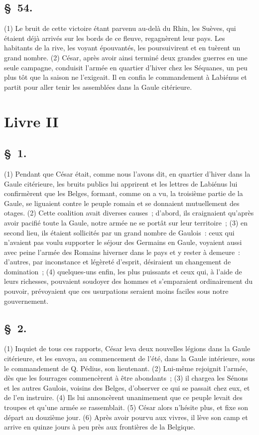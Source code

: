 \documentclass[french,twoside]{book} %
\begin{document}
\subsection[{§ 54.}]{ \textsc{§ 54.} }
\noindent (1) Le bruit de cette victoire étant parvenu au-delà du Rhin, les Suèves, qui étaient déjà arrivés sur les bords de ce fleuve, regagnèrent leur pays. Les habitants de la rive, les voyant épouvantés, les poursuivirent et en tuèrent un grand nombre. (2) César, après avoir ainsi terminé deux grandes guerres en une seule campagne, conduisit l’armée en quartier d’hiver chez les Séquanes, un peu plus tôt que la saison ne l’exigeait. Il en confia le commandement à Labiénus et partit pour aller tenir les assemblées dans la Gaule citérieure.
\section[{Livre II}]{Livre II}\renewcommand{\leftmark}{Livre II}

\subsection[{§ 1.}]{ \textsc{§ 1.} }
\noindent (1) Pendant que César était, comme nous l’avons dit, en quartier d’hiver dans la Gaule citérieure, les bruits publics lui apprirent et les lettres de Labiénus lui confirmèrent que les Belges, formant, comme on a vu, la troisième partie de la Gaule, se liguaient contre le peuple romain et se donnaient mutuellement des otages. (2) Cette coalition avait diverses causes ; d’abord, ils craignaient qu’après avoir pacifié toute la Gaule, notre armée ne se portât sur leur territoire ; (3) en second lieu, ils étaient sollicités par un grand nombre de Gaulois : ceux qui n’avaient pas voulu supporter le séjour des Germains en Gaule, voyaient aussi avec peine l’armée des Romains hiverner dans le pays et y rester à demeure : d’autres, par inconstance et légèreté d’esprit, désiraient un changement de domination ; (4) quelques-uns enfin, les plus puissants et ceux qui, à l’aide de leurs richesses, pouvaient soudoyer des hommes et s’emparaient ordinairement du pouvoir, prévoyaient que ces usurpations seraient moins faciles sous notre gouvernement.
\subsection[{§ 2.}]{ \textsc{§ 2.} }
\noindent (1) Inquiet de tous ces rapports, César leva deux nouvelles légions dans la Gaule citérieure, et les envoya, au commencement de l’été, dans la Gaule intérieure, sous le commandement de Q. Pédius, son lieutenant. (2) Lui-même rejoignit l’armée, dès que les fourrages commencèrent à être abondants ; (3) il chargea les Sénons et les autres Gaulois, voisins des Belges, d’observer ce qui se passait chez eux, et de l’en instruire. (4) Ils lui annoncèrent unanimement que ce peuple levait des troupes et qu’une armée se rassemblait. (5) César alors n’hésite plus, et fixe son départ au douzième jour. (6) Après avoir pourvu aux vivres, il lève son camp et arrive en quinze jours à peu près aux frontières de la Belgique.
\end{document}
